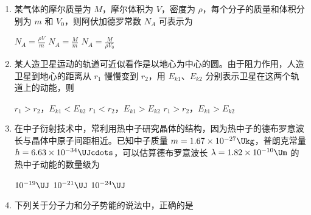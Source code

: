 \documentclass[\gkver]{gaokaozhenti}
\begin{document}
\begin{enumerate}

\item
某气体的摩尔质量为 $M$，摩尔体积为 $V$，密度为 $\rho$，每个分子的质量和体积分别为 $m$ 和 $V_{0}$，则阿伏加德罗常数 $N_{A}$ 可表示为

{$N_{A}=\frac{\rho V}{m}$}
{$N_{A}=\frac{M}{m}$}
{$N_{A}=\frac{M}{\rho V_{0}}$}


\item
某人造卫星运动的轨道可近似看作是以地心为中心的圆。由于阻力作用，人造卫星到地心的距离从 $r_{1}$ 慢慢变到 $r_{2}$，用 $E_{k1}$、$E_{k2}$ 分别表示卫星在这两个轨道上的动能，则

{$r_{1}>r_{2}$，$E_{k1}<E_{k2}$}
{$r_{1}<r_{2}$，$E_{k1}>E_{k2}$}
{$r_{1}>r_{2}$，$E_{k1}>E_{k2}$}


\item
在中子衍射技术中，常利用热中子研究晶体的结构，因为热中子的德布罗意波长与晶体中原子间距相近。已知中子质量 $m=1.67\times10^{-27}\Ukg$，普朗克常量 $h=6.63\times10^{-34}\UJcdots$，可以估算德布罗意波长 $\lambda=1.82\times10^{-10}\Um$ 的热中子动能的数量级为

{$10^{-19}\UJ$}
{$10^{-21}\UJ$}
{$10^{-24}\UJ$}


\item
下列关于分子力和分子势能的说法中，正确的是


\end{enumerate}
\end{document}
